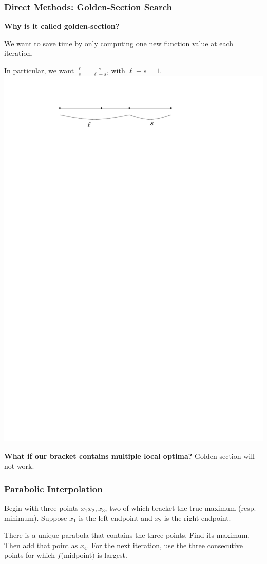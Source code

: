 \documentclass[12pt]{beamer}
\theoremstyle{definition}
\begin{document}
\begin{frame}
\frametitle{Direct Methods: Golden-Section Search}

{\bf Why is it called golden-section?}

We want to save time by only computing one new function value
at each iteration.

\vspace{5mm}

In particular, we want $\frac{\ell}{s} = \frac{s}{\ell-s}$, with
$\ell + s = 1$.
\includegraphics{opt-fig.pdf}



{\bf What if our bracket contains multiple local optima?} Golden
section will not work.
\end{frame}
\begin{frame}
\frametitle{Parabolic Interpolation}

Begin with three points $x_1x_2,x_3$, two of which bracket the true maximum (resp. minimum). Suppose $x_1$ is the left endpoint and $x_2$ is the right
endpoint.

There is a unique parabola that contains the three points. Find its maximum.
Then add that point as $x_4$. For the next iteration, use the three
consecutive points for which $f($midpoint$)$ is largest.
\end{frame}
\end{document}

